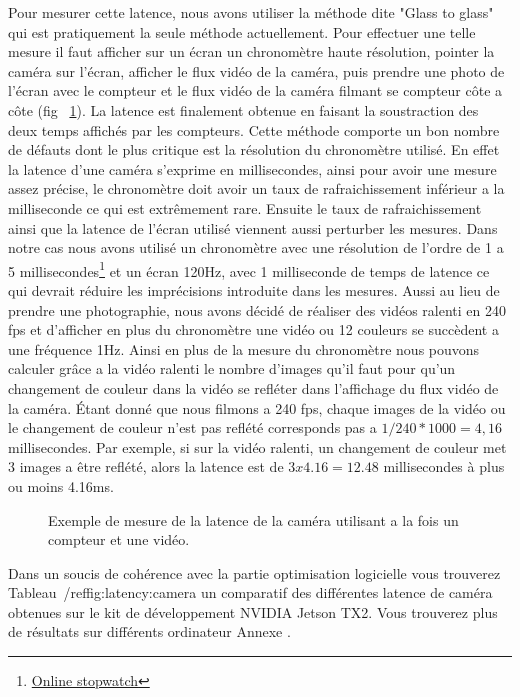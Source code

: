 Pour mesurer cette latence, nous avons utiliser la méthode dite "Glass to glass" qui est pratiquement la seule méthode actuellement. Pour effectuer une telle mesure il faut afficher sur un écran un chronomètre haute résolution, pointer la caméra sur l'écran, afficher le flux vidéo de la caméra, puis prendre une photo de l'écran avec le compteur et le flux vidéo de la caméra filmant se compteur côte a côte (fig ~\ref{fig:latency:glasstoglass}). La latence est finalement obtenue en faisant la soustraction des deux temps affichés par les compteurs. Cette méthode comporte un bon nombre de défauts dont le plus critique est la résolution du chronomètre utilisé. En effet la latence d'une caméra s'exprime en millisecondes, ainsi pour avoir une mesure assez précise, le chronomètre doit avoir un taux de rafraichissement inférieur a la milliseconde ce qui est extrêmement rare. Ensuite le taux de rafraichissement ainsi que la latence de l'écran utilisé viennent aussi perturber les mesures. Dans notre cas nous avons utilisé un chronomètre avec une résolution de l'ordre de 1 a 5 millisecondes\footnote{\href{https://stopwatch.onlineclock.net/}{Online stopwatch}} et un écran 120Hz, avec 1 milliseconde de temps de latence ce qui devrait réduire les imprécisions introduite dans les mesures. Aussi au lieu de prendre une photographie, nous avons décidé de réaliser des vidéos ralenti en 240 fps et d'afficher en plus du chronomètre une vidéo ou 12 couleurs se succèdent a une fréquence 1Hz. Ainsi en plus de la mesure du chronomètre nous pouvons calculer grâce a la vidéo ralenti le nombre d'images qu'il faut pour qu'un changement de couleur dans la vidéo se refléter dans l'affichage du flux vidéo de la caméra. Étant donné que nous filmons a 240 fps, chaque images de la vidéo ou le changement de couleur n'est pas reflété corresponds pas a $1/240 * 1000 = 4,16$ millisecondes. Par exemple, si sur la vidéo ralenti, un changement de couleur met 3 images a être reflété, alors la latence est de $3 x 4.16 = 12.48$ millisecondes à plus ou moins 4.16ms.

\begin{figure}[H]
\caption{Exemple de mesure de la latence de la caméra utilisant a la fois un compteur et une vidéo.}
\label{fig:latency:glasstoglass}
\end{figure}

Dans un soucis de cohérence avec la partie optimisation logicielle vous trouverez Tableau~/ref{fig:latency:camera} un comparatif des différentes latence de caméra obtenues sur le kit de développement NVIDIA Jetson TX2. Vous trouverez plus de résultats sur différents ordinateur Annexe %
.

